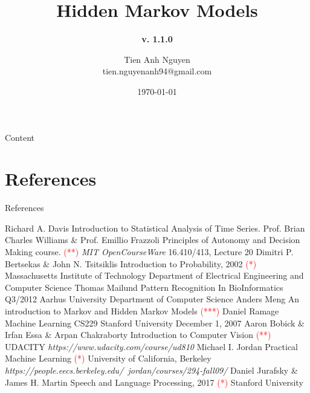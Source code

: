 \documentclass[10pt]{beamer}
\title[] %
{ %
      \textbf{Hidden Markov Models}
}
\subtitle[Hidden Markov Models]
{
      \textbf{v. 1.1.0}
}
\author[Tien Anh Nguyen]
{      Tien Anh Nguyen \\
      {\ttfamily tien.nguyenanh94@gmail.com}
}
\institute[]
{
      Faculty of Electronics and Computer Engineering\\
      Chonnam National University\\
  
}
\date{\today}
\begin{document}

{\1%
\begin{frame}[plain,noframenumbering] %
  \titlepage %
\end{frame}}


\begin{frame}[allowframebreaks]{Content}
\tableofcontents
\end{frame}

\section{References}
\begin{frame}[allowframebreaks]{References}
\begin{thebibliography}{9}
  Richard A. Davis
  \newblock Introduction to Statistical Analysis of Time Series.
  Prof. Brian Charles Williams \& Prof. Emillio Frazzoli
  \newblock Principles of Autonomy and Decision Making course. \textcolor{red}{(**)}
  \newblock \emph{MIT OpenCourseWare} 16.410/413, Lecture 20
  Dimitri P. Bertsekas \& John N. Tsitsiklis
  \newblock Introduction to Probability, 2002 \textcolor{red}{(*)}
  \newblock Massachusetts Institute of Technology
  \newblock Department of Electrical Engineering and Computer Science
  Thomas Mailund
  \newblock Pattern Recognition In BioInformatics Q3/2012
  \newblock Aarhus University
  \newblock Department of Computer Science
  Anders Meng
  \newblock An introduction to Markov and Hidden Markov Models \textcolor{red}{(***)}
  Daniel Ramage
  \newblock Machine Learning CS229
  \newblock Stanford University
  \newblock December 1, 2007
  Aaron Bobick \& Irfan Essa \& Arpan Chakraborty 
  \newblock Introduction to Computer Vision \textcolor{red}{(**)}
  \newblock UDACITY
  \newblock \emph{https://www.udacity.com/course/ud810}
  Michael I. Jordan 
  \newblock Practical Machine Learning \textcolor{red}{(*)}
  \newblock University of California, Berkeley
  \newblock \emph{https://people.eecs.berkeley.edu/~jordan/courses/294-fall09/}
  Daniel Jurafsky \& James H. Martin 
  \newblock Speech and Language Processing, 2017 \textcolor{red}{(*)}
  \newblock Stanford University
\end{thebibliography}
\end{frame}
\end{document}
